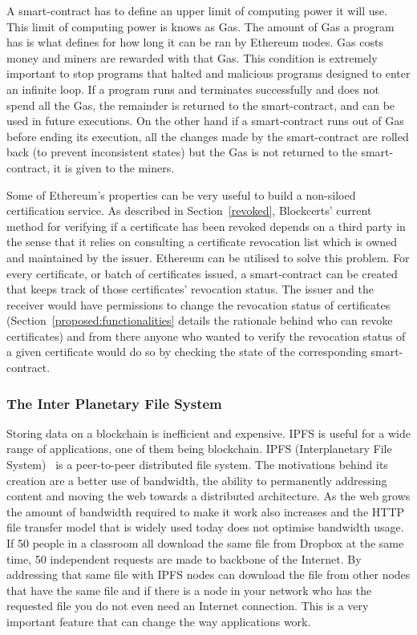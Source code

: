 A smart-contract has to define an upper limit of computing power it will use. This limit of computing power is knows as Gas. The amount of Gas a program has is what defines for how long it can be ran by Ethereum nodes. Gas costs money and miners are rewarded with that Gas. This condition is extremely important to stop programs that halted and malicious programs designed to enter an infinite loop. If a program runs and terminates successfully and does not spend all the Gas, the remainder is returned to the smart-contract, and can be used in future executions. On the other hand if a smart-contract runs out of Gas before ending its execution, all the changes made by the smart-contract are rolled back (to prevent inconsistent states) but the Gas is not returned to the smart-contract, it is given to the miners.

Some of Ethereum's properties can be very useful to build a non-siloed certification service. As described in Section~\ref{revoked}, Blockcerts' current method for verifying if a certificate has been revoked depends on a third party in the sense that it relies on consulting a certificate revocation list which is owned and maintained by the issuer. Ethereum can be utilised to solve this problem. For every certificate, or batch of certificates issued, a smart-contract can be created that keeps track of those certificates' revocation status. The issuer and the receiver would have permissions to change the revocation status of certificates (Section~\ref{proposed:functionalities} details the rationale behind who can revoke certificates) and from there anyone who wanted to verify the revocation status of a given certificate would do so by checking the state of the corresponding smart-contract.


\subsubsection{The Inter Planetary File System}
\label{rel:ipfs}

Storing data on a blockchain is inefficient and expensive. IPFS is useful for a wide range of applications, one of them being blockchain. IPFS (Interplanetary File System)~\cite{Benet:2014vw} is a peer-to-peer distributed file system. The motivations behind its creation are a better use of bandwidth, the ability to permanently addressing content and moving the web towards a distributed architecture.
As the web grows the amount of bandwidth required to make it work also increases and the HTTP %
file transfer model that is widely used today does not optimise bandwidth usage. If 50 people in a classroom all download the same file from Dropbox at the same time, 50 independent requests are made to backbone of the Internet. By addressing that same file with IPFS nodes can download the file from other nodes that have the same file and if there is a node in your network who has the requested file you do not even need an Internet connection. This is a very important feature that can change the way applications work.

